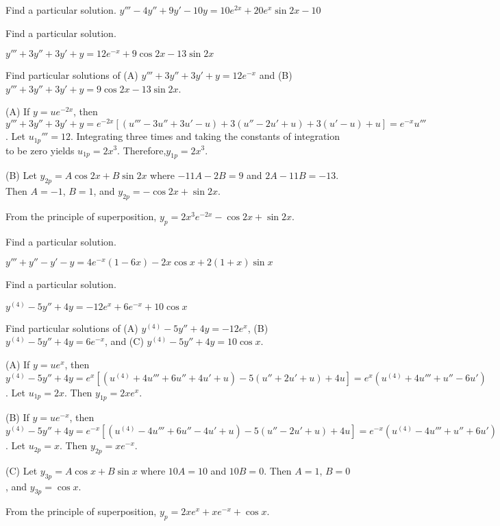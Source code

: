 \documentclass{ximera}
\begin{document}
\begin{problem}\label{exer:9.3.51}   Find a particular solution.   $y'''-4y''+9y'-10y=10e^{2x}+20e^x\sin2x-10$
\end{problem}

\begin{problem}\label{exer:9.3.52}   Find a particular solution.

$y'''+3y''+3y'+y=12e^{-x}+9\cos2x-13\sin2x$

\begin{hint}
Find particular solutions of
(A) $y'''+3y''+3y'+y=12e^{-x}$ and (B) $y'''+3y''+3y'+y=9\cos2x-13\sin2x$.
\end{hint}

\begin{solution}
(A) If $y=ue^{-2x}$, then $y'''+3y''+3y'+y=e^{-2x}[
(u'''-3u''+3u'-u) +3(u''-2u'+u) +3(u'-u) +u]
=e^{-x}u'''$. Let $u_{1p}'''=12$. Integrating three times and
taking the constants of integration to be zero yields
$u_{1p}=2x^3$. Therefore,$y_{1p}=2x^3$.

(B)  Let $y_{2p}=A\cos2x+B\sin2x$ where $-11A-2B=9$ and $2A-11B=-13$.
Then $A=-1$, $B=1$, and
 $y_{2p}=-\cos2x+\sin2x$.

From the principle of superposition,
 $y_p=2x^3e^{-2x}-\cos2x+\sin2x$.
\end{solution}
\end{problem}

\begin{problem}\label{exer:9.3.53}   Find a particular solution.

$y'''+y''-y'-y=4e^{-x}(1-6x)-2x\cos x+2(1+x)\sin
x $
\end{problem}

\begin{problem}\label{exer:9.3.54}   Find a particular solution.

$y^{(4)}-5y''+4y=-12e^x+6e^{-x}+10\cos x$

\begin{hint}
Find particular solutions of
(A) $y^{(4)}-5y''+4y=-12e^x$,
(B) $y^{(4)}-5y''+4y=6e^{-x}$, and
(C) $y^{(4)}-5y''+4y=10\cos x$.
\end{hint}

\begin{solution}
(A) If $y=ue^x$, then $y^{(4)}-5y''+4y=e^x[
(u^{(4)}+4u'''+6u''+4u'+u) -5(u''+2u'+u) +4u]
=e^x(u^{(4)}+4u'''+u''-6u')$. Let $u_{1p}=2x$. Then $y_{1p}=2xe^x$.


(B) If $y=ue^{-x}$, then $y^{(4)}-5y''+4y=e^{-x}[
(u^{(4)}-4u'''+6u''-4u'+u) -5(u''-2u'+u) +4u]
=e^{-x}(u^{(4)}-4u'''+u''+6u')$. Let $u_{2p}=x$. Then
$y_{2p}=xe^{-x}$.

(C) Let $y_{3p}=A\cos x+B\sin x$ where $10A=10$ and $10B=0$. Then
$A=1$, $B=0$, and $y_{3p}=\cos x$.

From the principle of superposition, $y_p=2xe^x+xe^{-x}+\cos x$.
\end{solution}
\end{problem}
\end{document}
